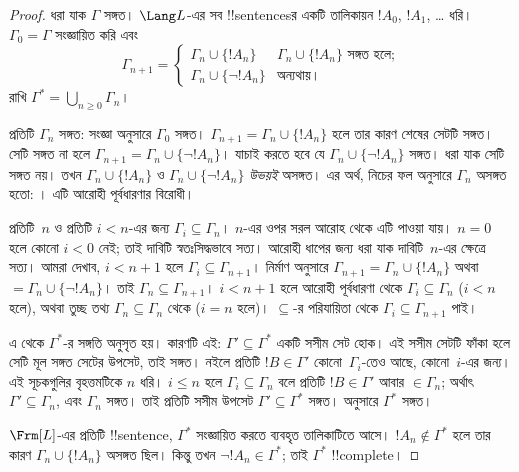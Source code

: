 \documentclass[../../../include/open-logic-section]{subfiles}
\begin{document}
\begin{proof}
ধরা যাক $\Gamma$ সঙ্গত। $\Lang L$-এর সব !!{sentence}sর একটি তালিকায়ন
$!A_0$, $!A_1$, \dots{} ধরি। $\Gamma_0 = \Gamma$ সংজ্ঞায়িত করি এবং
\[
\Gamma_{n+1} =
\begin{cases}
\Gamma_n \cup \{ !A_n \} & \textrm{$\Gamma_n \cup \{!A_n\}$ সঙ্গত হলে;} \\
\Gamma_n \cup \{ \lnot !A_n \} & \textrm{অন্যথায়।}
\end{cases}
\]
রাখি $\Gamma^* = \bigcup_{n \geq 0} \Gamma_n$।

প্রতিটি $\Gamma_n$ সঙ্গত: সংজ্ঞা অনুসারে $\Gamma_0$ সঙ্গত।
$\Gamma_{n+1} = \Gamma_n \cup \{!A_n\}$ হলে তার কারণ শেষের সেটটি সঙ্গত।
সেটি সঙ্গত না হলে $\Gamma_{n+1} = \Gamma_n \cup \{\lnot !A_n\}$। যাচাই
করতে হবে যে $\Gamma_n \cup \{\lnot !A_n\}$ সঙ্গত। ধরা যাক সেটি সঙ্গত
নয়। তখন $\Gamma_n \cup \{!A_n\}$ ও $\Gamma_n \cup \{\lnot !A_n\}$
\emph{উভয়ই} অসঙ্গত। এর অর্থ, নিচের ফল অনুসারে $\Gamma_n$ অসঙ্গত হতো:
।
এটি আরোহী পূর্বধারণার বিরোধী।

প্রতিটি~$n$ ও প্রতিটি $i < n$-এর জন্য $\Gamma_i \subseteq \Gamma_n$।
$n$-এর ওপর সরল আরোহ থেকে এটি পাওয়া যায়। $n=0$ হলে কোনো $i < 0$ নেই;
তাই দাবিটি স্বতঃসিদ্ধভাবে সত্য। আরোহী ধাপের জন্য ধরা যাক দাবিটি~$n$-এর
ক্ষেত্রে সত্য। আমরা দেখাব, $i < n+1$ হলে $\Gamma_i \subseteq
\Gamma_{n+1}$। নির্মাণ অনুসারে $\Gamma_{n+1} = \Gamma_n \cup \{!A_n\}$
অথবা $= \Gamma_n \cup \{\lnot !A_n\}$। তাই $\Gamma_n \subseteq
\Gamma_{n+1}$। $i < n+1$ হলে আরোহী পূর্বধারণা থেকে $\Gamma_i \subseteq
\Gamma_n$ ($i < n$ হলে), অথবা তুচ্ছ তথ্য $\Gamma_n \subseteq \Gamma_n$
থেকে ($i = n$ হলে)। $\subseteq$-র পরিযায়িতা থেকে $\Gamma_i \subseteq
\Gamma_{n+1}$ পাই।

এ থেকে $\Gamma^*$-র সঙ্গতি অনুসৃত হয়। কারণটি এই: $\Gamma' \subseteq
\Gamma^*$ একটি সসীম সেট হোক। এই সসীম সেটটি ফাঁকা হলে সেটি মূল সঙ্গত
সেটের উপসেট, তাই সঙ্গত।
নইলে প্রতিটি $!B \in \Gamma'$ কোনো~$\Gamma_i$-তেও আছে, কোনো~$i$-এর
জন্য। এই সূচকগুলির বৃহত্তমটিকে $n$ ধরি। $i \le n$ হলে
$\Gamma_i \subseteq \Gamma_n$ বলে প্রতিটি $!B \in \Gamma'$ আবার
$\in \Gamma_n$; অর্থাৎ $\Gamma' \subseteq \Gamma_n$, এবং
$\Gamma_n$ সঙ্গত। তাই প্রতিটি সসীম উপসেট $\Gamma' \subseteq \Gamma^*$
সঙ্গত।
অনুসারে $\Gamma^*$ সঙ্গত।

$\Frm[L]$-এর প্রতিটি !!{sentence}, $\Gamma^*$ সংজ্ঞায়িত করতে ব্যবহৃত
তালিকাটিতে আসে। $!A_n \notin \Gamma^*$ হলে তার কারণ $\Gamma_n \cup
\{!A_n\}$ অসঙ্গত ছিল। কিন্তু তখন $\lnot !A_n \in \Gamma^*$; তাই
$\Gamma^*$ !!{complete}।
\end{proof}
\end{document}

